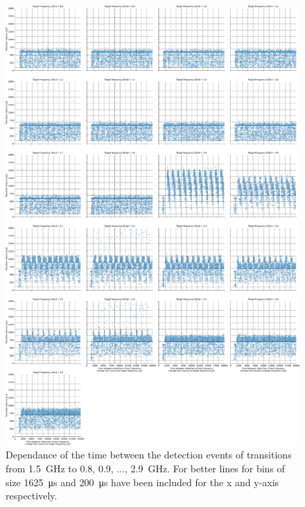 \begin{figure}[]
    \centering
    \includegraphics[width=\columnwidth]{fig/ftalat_scatter_wait_transition_latency_hati_source_1.5.pdf}
    \caption{Dependance of the time between the detection events of transitions from \SI{1.5}{\GHz} to \SI{0.8}{}, \SI{0.9}{}, ..., \SI{2.9}{\GHz}. For better lines for bins of size \SI{1625}{\us} and \SI{200}{\us} have been included for the x and y-axis respectively.}
\end{figure}
